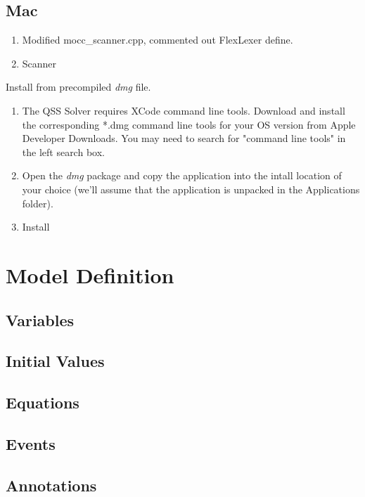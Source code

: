 \documentclass[11pt,a4paper]{article}
\begin{document}
\subsection{Mac}

\begin{enumerate}
\item Modified mocc\_scanner.cpp, commented out FlexLexer define.
\item Scanner 
\end{enumerate}

Install from precompiled \emph{dmg} file.
\begin{enumerate}
\item The QSS Solver requires XCode command line tools. Download and install the corresponding *.dmg command line tools for your OS version from Apple Developer Downloads. You may need to search for "command line tools" in the left search box. 
\item Open the \emph{dmg} package and copy the application into the intall location of your choice (we'll  assume that the application is unpacked in the Applications folder).
\item Install  
\end{enumerate}


\section{Model Definition}

\subsection{Variables}

\subsection{Initial Values}

\subsection{Equations}

\subsection{Events}

\subsection{Annotations}
\end{document}
